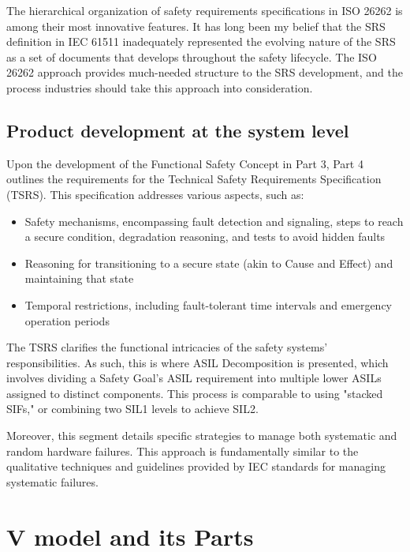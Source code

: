 \documentclass[./dissertation.tex]{subfiles}
\begin{document}
The hierarchical organization of safety requirements specifications in ISO 26262 is among their most innovative features. It has long been my belief that the SRS definition in IEC 61511 inadequately represented the evolving nature of the SRS as a set of documents that develops throughout the safety lifecycle. The ISO 26262 approach provides much-needed structure to the SRS development, and the process industries should take this approach into consideration.




\subsection{Product development at the system level}
Upon the development of the Functional Safety Concept in Part 3, Part 4 outlines the requirements for the Technical Safety Requirements Specification (TSRS). This specification addresses various aspects, such as:

\begin{itemize}
\item Safety mechanisms, encompassing fault detection and signaling, steps to reach a secure condition, degradation reasoning, and tests to avoid hidden faults
\item Reasoning for transitioning to a secure state (akin to Cause and Effect) and maintaining that state
\item Temporal restrictions, including fault-tolerant time intervals and emergency operation periods
\end{itemize}

The TSRS clarifies the functional intricacies of the safety systems' responsibilities. As such, this is where ASIL Decomposition is presented, which involves dividing a Safety Goal's ASIL requirement into multiple lower ASILs assigned to distinct components. This process is comparable to using "stacked SIFs," or combining two SIL1 levels to achieve SIL2.

Moreover, this segment details specific strategies to manage both systematic and random hardware failures. This approach is fundamentally similar to the qualitative techniques and guidelines provided by IEC standards for managing systematic failures.


\section {V model and its Parts}
\end{document}
